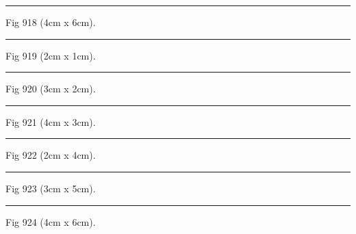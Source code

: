 \documentclass[a4paper,11pt]{article}
\begin{document}
\begin{swarmwrap}%
  \begin{minipage}[t]{4cm}
    \centering
    \rule{\linewidth}{6cm}
    {\footnotesize Fig 918 (4cm x 6cm).}
  \end{minipage}%
\end{swarmwrap}%
\swarmwrapnext
\lipsum[18]%

\begin{swarmwrap}%
  \begin{minipage}[t]{2cm}
    \centering
    \rule{\linewidth}{1cm}
    {\footnotesize Fig 919 (2cm x 1cm).}
  \end{minipage}%
\end{swarmwrap}%
\swarmwrapnext
\lipsum[19]%

\begin{swarmwrap}%
  \begin{minipage}[t]{3cm}
    \centering
    \rule{\linewidth}{2cm}
    {\footnotesize Fig 920 (3cm x 2cm).}
  \end{minipage}%
\end{swarmwrap}%
\swarmwrapnext
\lipsum[20]%

\begin{swarmwrap}%
  \begin{minipage}[t]{4cm}
    \centering
    \rule{\linewidth}{3cm}
    {\footnotesize Fig 921 (4cm x 3cm).}
  \end{minipage}%
\end{swarmwrap}%
\swarmwrapnext
\lipsum[21]%

\begin{swarmwrap}%
  \begin{minipage}[t]{2cm}
    \centering
    \rule{\linewidth}{4cm}
    {\footnotesize Fig 922 (2cm x 4cm).}
  \end{minipage}%
\end{swarmwrap}%
\swarmwrapnext
\lipsum[22]%

\begin{swarmwrap}%
  \begin{minipage}[t]{3cm}
    \centering
    \rule{\linewidth}{5cm}
    {\footnotesize Fig 923 (3cm x 5cm).}
  \end{minipage}%
\end{swarmwrap}%
\swarmwrapnext
\lipsum[23]%

\begin{swarmwrap}%
  \begin{minipage}[t]{4cm}
    \centering
    \rule{\linewidth}{6cm}
    {\footnotesize Fig 924 (4cm x 6cm).}
  \end{minipage}%
\end{swarmwrap}%
\swarmwrapnext
\lipsum[24]%
\end{document}
